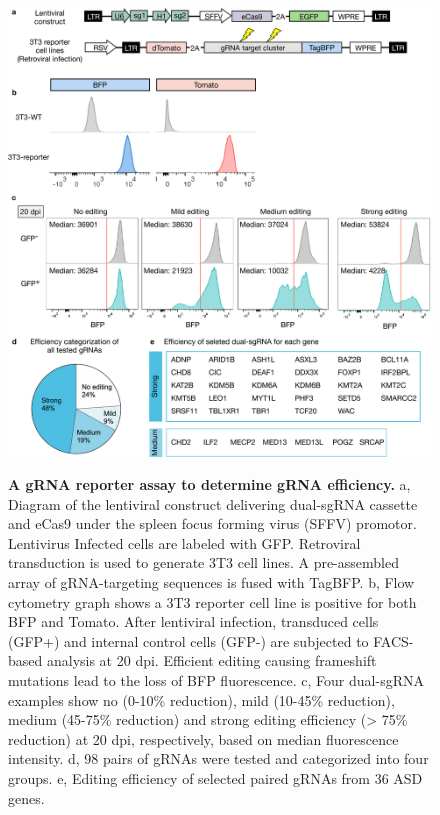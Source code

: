 \begin{figure}[h!]
    \centering
	\includegraphics[width=\textwidth]{figures/asd/Figure_S1}
    \label{fig:asdS1}
    \caption{\textbf{A gRNA reporter assay to determine gRNA efficiency.} a, Diagram of the lentiviral construct delivering dual-sgRNA cassette and eCas9 under the spleen focus forming virus (SFFV) promotor. Lentivirus Infected cells are labeled with GFP. Retroviral transduction is used to generate 3T3 cell lines. A pre-assembled array of gRNA-targeting sequences is fused with TagBFP. b, Flow cytometry graph shows a 3T3 reporter cell line is positive for both BFP and Tomato. After lentiviral infection, transduced cells (GFP+) and internal control cells (GFP-) are subjected to FACS-based analysis at 20 dpi. Efficient editing causing frameshift mutations lead to the loss of BFP fluorescence. c, Four dual-sgRNA examples show no (0-10\% reduction), mild (10-45\% reduction), medium (45-75\% reduction) and strong editing efficiency (> 75\% reduction) at 20 dpi, respectively, based on median fluorescence intensity. d, 98 pairs of gRNAs were tested and categorized into four groups. e, Editing efficiency of selected paired gRNAs from 36 ASD genes.}
\end{figure}



